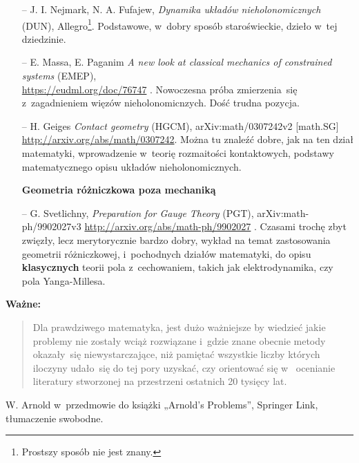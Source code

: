 \documentclass[a4paper,11pt]{article}
\begin{document}
\begin{itemize}
\item[--] J. I. Nejmark, N. A. Fufajew, \textit{Dynamika układów
    nieholonomicznych} (DUN), Allegro\footnote{Prostszy sposób nie
    jest znany.}. Podstawowe, w~dobry sposób staroświeckie, dzieło
  w~tej dziedzinie.

\item[--] E. Massa, E. Paganim \textit{A new look at classical mechanics
    of constrained systems} (EMEP), \\
  \url{https://eudml.org/doc/76747} . Nowoczesna próba zmierzenia~się
  z~zagadnieniem więzów nieholonomicnzych. Dość trudna pozycja.

\item[--] H. Geiges \textit{Contact geometry} (HGCM),
  arXiv:math/0307242v2 [math.SG]
  \url{http://arxiv.org/abs/math/0307242}. Można tu znaleźć dobre,
  jak na ten dział matematyki, wprowadzenie w~teorię rozmaitości
  kontaktowych, podstawy matematycznego opisu układów
  nieholonomicznych.


\item[] \textbf{Geometria różniczkowa poza mechaniką}

\item[--] G. Svetlichny, \textit{Preparation for Gauge Theory} (PGT),
  arXiv:math-ph/9902027v3 \url{http://arxiv.org/abs/math-ph/9902027} .
  Czasami trochę zbyt zwięzły, lecz merytorycznie bardzo dobry, wykład
  na temat zastosowania geometrii różniczkowej, i~pochodnych działów
  matematyki, do opisu \textbf{klasycznych} teorii pola z~cechowaniem,
  takich jak elektrodynamika, czy pola Yanga-Millesa.

\end{itemize}





\textbf{Ważne:}

\begin{quote}

  Dla prawdziwego matematyka, jest dużo ważniejsze by wiedzieć jakie
  problemy nie zostały wciąż rozwiązane i~gdzie znane obecnie metody
  okazały~się niewystarczające, niż pamiętać wszystkie liczby których
  iloczyny udało~się do tej pory uzyskać, czy orientować się w~
  ocenianie literatury stworzonej na przestrzeni ostatnich 20 tysięcy
  lat.

\end{quote}

W. Arnold w~przedmowie do książki „Arnold's Problems”, Springer Link, tłumaczenie swobodne.
\end{document}
